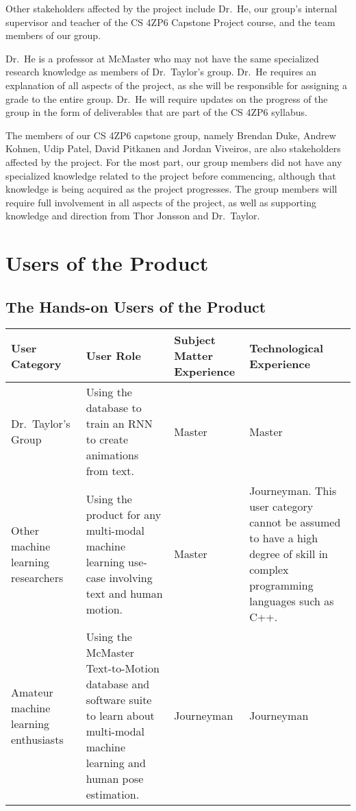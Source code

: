 \documentclass{scrreprt}
\begin{document}
Other stakeholders affected by the project include Dr.\ He, our group's internal
supervisor and teacher of the CS 4ZP6 Capstone Project course, and the team
members of our group.

Dr.\ He is a professor at McMaster who may not have the same specialized
research knowledge as members of Dr.\ Taylor's group. Dr.\ He requires an
explanation of all aspects of the project, as she will be responsible for
assigning a grade to the entire group. Dr.\ He will require updates on the
progress of the group in the form of deliverables that are part of the CS 4ZP6
syllabus.

The members of our CS 4ZP6 capstone group, namely Brendan Duke, Andrew Kohnen,
Udip Patel, David Pitkanen and Jordan Viveiros, are also stakeholders affected
by the project. For the most part, our group members did not have any
specialized knowledge related to the project before commencing, although that
knowledge is being acquired as the project progresses. The group members will
require full involvement in all aspects of the project, as well as supporting
knowledge and direction from Thor Jonsson and Dr.\ Taylor.

\section{Users of the Product}

\subsection{The Hands-on Users of the Product}

\begin{center}
    \begin{tabular}{ | p{2cm} | p{4cm} | p{2cm} | p{4cm} |}
    \hline
    User Category & User Role & Subject Matter Experience &
    Technological Experience \\ \hline
    Dr.\ Taylor's Group & Using the database to train an RNN to create
            animations from text. & Master & Master \\
    Other machine learning researchers & Using the product for any multi-modal
            machine learning use-case involving text and human motion. & Master
            & Journeyman. This user category cannot be assumed to have a high
            degree of skill in complex programming languages such as C++. \\
    Amateur machine learning enthusiasts & Using the McMaster Text-to-Motion
            database and software suite to learn about multi-modal machine
            learning and human pose estimation. & Journeyman & Journeyman \\
    \hline
    \end{tabular}
\end{center}
\end{document}
